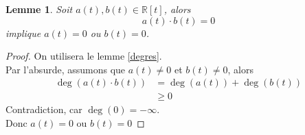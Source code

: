 \documentclass[11pt, a4paper, twoside]{article}
\newtheorem{lemma}{Lemme}
\begin{document}
\begin{lemma}\label{produit}
	Soit $a(t), b(t) \in \mathbb{R}[t]$, alors 
	\[ 
		a(t) \cdot b(t) = 0
	\]
	implique $a(t)=0$ ou $b(t)=0$.
\end{lemma}
\begin{proof}
	On utilisera le lemme \ref{degres}.\\
	Par l'absurde, assumons que $a(t) \neq 0$ et $b(t)\neq 0$, alors
	\begin{align*}
		\deg(a(t)\cdot b(t)) &= \deg(a(t)) + \deg(b(t))\\
				 &\geq 0 
	\end{align*}
	Contradiction, car $\deg(0) = - \infty $.\\
	Donc $a(t)=0$ ou $b(t)=0$
	
\end{proof}
\end{document}
